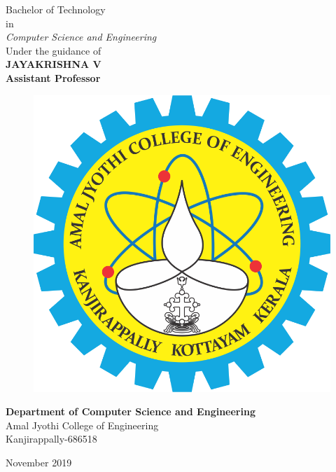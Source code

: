 \begin{titlepage}
\begin{center}
Bachelor of Technology\\
\vspace{0.2cm}
in\\
\vspace{0.2cm}
\textit{Computer Science and Engineering}\\
\vspace{0.5cm}
Under the guidance of\\
\vspace{0.2cm}
{\textbf{JAYAKRISHNA V}} \\
\textbf{Assistant Professor}\\
\end{center}
\vspace{0.2cm}
\begin{figure}[h]
\centering
\includegraphics[scale=.5]{ajcelogo.png}
\end{figure}
\begin{center}
\vspace{0.2cm}
{\large\textbf{Department of Computer Science and Engineering}}\\
\vspace{0.5cm}
Amal Jyothi College of Engineering\\
Kanjirappally-686518\\
\end{center}
\begin{center}
\vspace{0.5cm}
{\large November 2019} \\
\end{center}
\end{titlepage}